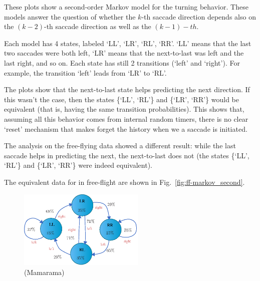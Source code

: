 These plots show a second-order Markov model for the turning behavior. These models answer the question of whether the $k$-th saccade direction depends also on the $(k-2)$-th saccade direction as well as the $(k-1)-th$. 

Each model has 4 states, labeled `LL',  `LR', `RL', `RR'. `LL' means that the last two saccades were both left, `LR' means that the next-to-last was left and the last right, and so on. Each state has still 2 transitions (`left' and `right'). For example, the transition `left' leads from  `LR' to `RL'.

The plots show that the next-to-last state helps predicting the next direction. If this wasn't the case, then the states \{`LL', `RL'\} and \{`LR', `RR'\} would be equivalent (that is, having the same transition probabilities).
This shows that, assuming all this behavior comes from internal random timers, there is no clear `reset' mechanism that makes forget the history when we a saccade is initiated. 

The analysis on the free-flying data showed a different result: while the last saccade helps in predicting the next, the next-to-last does not (the states \{`LL', `RL'\} and \{`LR', `RR'\} were indeed equivalent).

The equivalent data for  \Dmelanogaster in free-flight  are shown in Fig.~\vref{fig:ff-markov_second}.

\vfill
\begin{figure}[h!]
	\centering
	\includegraphics[width=6cm]{../comments/freeflight/markov_second}
	\caption{ \label{fig:ff-markov_second}   \Dmelanogaster (Mamarama) }
\end{figure}